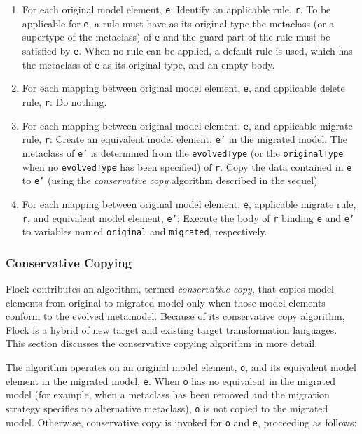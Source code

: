 \begin{enumerate}
	\item For each original model element, \texttt{e}:
	\subitem Identify an applicable rule, \texttt{r}. To be applicable for \texttt{e}, a rule must have as its original type the metaclass (or a supertype of the metaclass) of \texttt{e} and the guard part of the rule must be satisfied by \texttt{e}.
	\subitem When no rule can be applied, a default rule is used, which has the metaclass of \texttt{e} as its original type, and an empty body.
	
	\item For each mapping between original model element, \texttt{e}, and applicable delete rule, \texttt{r}:
	\subitem Do nothing.
	
	\item For each mapping between original model element, \texttt{e}, and applicable migrate rule, \texttt{r}:
	\subitem Create an equivalent model element, \texttt{e'} in the migrated model. The metaclass of \texttt{e'} is determined from the \texttt{evolvedType} (or the \texttt{originalType} when no \texttt{evolvedType} has been specified) of \texttt{r}.
	\subitem Copy the data contained in \texttt{e} to \texttt{e'} (using the \emph{conservative copy} algorithm described in the sequel).

	\item For each mapping between original model element, \texttt{e}, applicable migrate rule, \texttt{r}, and equivalent model element, \texttt{e'}:
	\subitem Execute the body of \texttt{r} binding \texttt{e} and \texttt{e'} to variables named \texttt{original} and \texttt{migrated}, respectively.
\end{enumerate}


\subsubsection{Conservative Copying}
\label{subsubsec:conservative_copying}
Flock contributes an algorithm, termed \emph{conservative copy}, that copies model elements from original to migrated model only when those model elements conform to the evolved metamodel. Because of its conservative copy algorithm, Flock is a hybrid of new target and existing target transformation languages. This section discusses the conservative copying algorithm in more detail.

The algorithm operates on an original model element, \texttt{o}, and its equivalent model element in the migrated model, \texttt{e}. When \texttt{o} has no equivalent in the migrated model (for example, when a metaclass has been removed and the migration strategy specifies no alternative metaclass), \texttt{o} is not copied to the migrated model. Otherwise, conservative copy is invoked for \texttt{o} and \texttt{e}, proceeding as follows:

